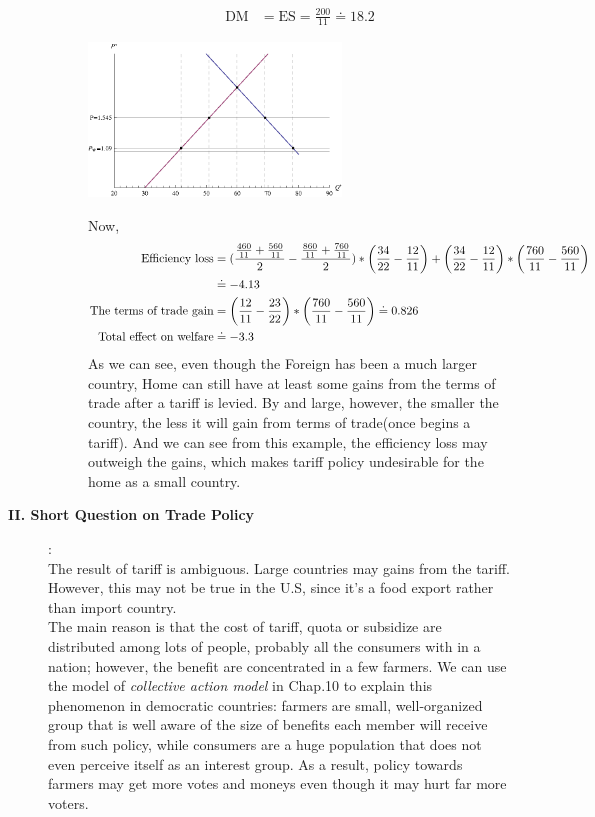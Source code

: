 \documentclass{article}
\begin{document}
\begin{description}
\begin{description}
\begin{align}
          \text{DM}&=\text{ES}=\frac{200}{11}\doteq 18.2
        \end{align}
        \begin{center}
                 \includegraphics[angle=0, width=0.6\textwidth]{ECON3610BA4P6}
        \end{center}
        Now,
        \begin{align}\notag
        \text{Efficiency loss}&=(\frac{\frac{460}{11}+\frac{560}{11}}{2}-\frac{\frac{860}{11}+\frac{760}{11}}{2})*\left(\frac{34}{22}-\frac{12}{11}\right)+\left(\frac{34}{22}-\frac{12}{11}\right)*\left(\frac{760}{11}-\frac{560}{11}\right)\\  &\doteq -4.13\\
        \text{The terms of trade gain}&=\left(\frac{12}{11}-\frac{23}{22}\right)*\left(\frac{760}{11}-\frac{560}{11}\right)\doteq 0.826\\
        \text{Total effect on welfare}&\doteq -3.3
      \end{align}
      As we can see, even though the Foreign has been a much larger country, Home can still have at least some gains from the terms of trade after a tariff is levied. By and large, however, the smaller the country, the less it will gain from terms of trade(once begins a tariff). And we can see from this example, the efficiency loss may outweigh the gains, which makes tariff policy undesirable for the home as a small country.
\end{description}
    \item[{\bf II. Short Question on Trade Policy}]:\\
        The result of tariff is ambiguous. Large countries may gains from the tariff. However, this may not be true in the U.S, since it's a food export rather than import country.\\
        The main reason is that the cost of tariff, quota or subsidize are distributed among lots of people, probably all the consumers with in a nation; however, the benefit are concentrated in a few farmers. We can use the model of {\it collective action model} in Chap.10 to explain this phenomenon in democratic countries: farmers are small, well-organized group that is well aware of the size of benefits each member will receive from such policy, while consumers are a huge population that does not even perceive itself as an interest group. As a result, policy towards farmers may get more votes and moneys even though it may hurt far more voters.


\end{description}
\end{document}
